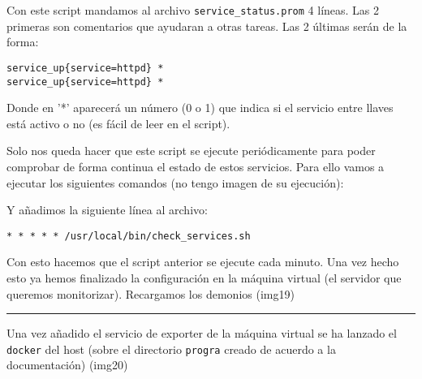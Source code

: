 Con este script mandamos al archivo \texttt{service\_status.prom} 4
líneas. Las 2 primeras son comentarios que ayudaran a otras tareas. Las
2 últimas serán de la forma:

\begin{verbatim}
service_up{service=httpd} *
service_up{service=httpd} *
\end{verbatim}

Donde en '*' aparecerá un número (0 o 1) que indica si el servicio entre
llaves está activo o no (es fácil de leer en el script).

Solo nos queda hacer que este script se ejecute periódicamente para
poder comprobar de forma continua el estado de estos servicios. Para
ello vamos a ejecutar los siguientes comandos (no tengo imagen de su
ejecución):

\begin{Shaded}
\begin{Highlighting}[]
\end{Highlighting}
\end{Shaded}

Y añadimos la siguiente línea al archivo:

\begin{verbatim}
* * * * * /usr/local/bin/check_services.sh
\end{verbatim}

Con esto hacemos que el script anterior se ejecute cada minuto. Una vez
hecho esto ya hemos finalizado la configuración en la máquina virtual
(el servidor que queremos monitorizar). Recargamos los demonios (img19)

\begin{Shaded}
\begin{Highlighting}[]
\end{Highlighting}
\end{Shaded}

\begin{center}\rule{0.5\linewidth}{0.5pt}\end{center}

Una vez añadido el servicio de exporter de la máquina virtual se ha
lanzado el \texttt{docker} del host (sobre el directorio \texttt{progra}
creado de acuerdo a la documentación) (img20)

\begin{Shaded}
\begin{Highlighting}[]
\end{Highlighting}
\end{Shaded}

